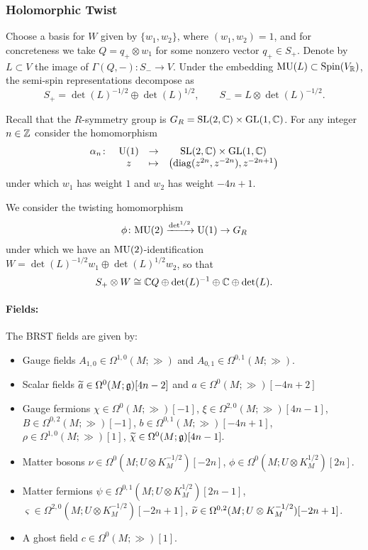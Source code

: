 \documentclass[10pt, oneside]{article}
\begin{document}
\subsubsection{Holomorphic Twist}
\label{sect:4d_2_holomorphictwist}

Choose a basis for $W$ given by $\{w_1, w_2\}$, where $(w_1, w_2) = 1$, and for concreteness we take $Q=q_+ \otimes w_1$ for some nonzero vector $q_+ \in S_+$. Denote by $L\subset V$ the image of $\Gamma(Q, -)\colon S_-\rightarrow V$. Under the embedding $\MU(L) \subset \Spin(V_\RR)$, the semi-spin representations decompose as
\[
S_+ = \det(L)^{-1/2} \oplus \det(L)^{1/2},\qquad S_- = L \otimes \det(L)^{-1/2} .
\]

Recall that the $R$-symmetry group is $G_R = \SL(2, \CC) \times \GL(1, \CC)$. For any integer $n\in\ZZ$ consider the homomorphism 
\[
\begin{array}{ccccc}
\alpha_n \colon & \U(1) & \rightarrow & \SL(2, \CC)\times \GL(1, \CC)\\
&  z & \mapsto & \left({\rm diag}(z^{2n}, z^{-2n}) , z^{-2n+1} \right)
\end{array}
\]
under which $w_1$ has weight $1$ and $w_2$ has weight $-4n+1$.

We consider the twisting homomorphism 
\[
\phi \colon \MU(2) \xto{\det^{1/2}} \U(1) \rightarrow G_R
\]
under which we have an $\MU(2)$-identification $W=\det(L)^{-1/2}w_1 \oplus \det(L)^{1/2}w_2$, so that
\[S_+\otimes W\cong \CC Q\oplus \det(L)^{-1}\oplus \CC\oplus \det(L).\]

\vspace{-10pt}
\paragraph{Fields:} The BRST fields are given by:
\begin{itemize}
\item Gauge fields $A_{1, 0}\in\Omega^{1, 0}(M; \gg)$ and $A_{0, 1}\in\Omega^{0, 1}(M; \gg)$.
\item Scalar fields $\Tilde{a} \in \Omega^{0}(M; \gg)[4n-2]$ and $a \in\Omega^{0}(M; \gg)[-4n+2]$
\item Gauge fermions $\chi \in \Omega^0(M ; \gg)[-1]$, $\xi \in \Omega^{2,0}(M ; \gg)[4n-1]$, $B \in \Omega^{0,2}(M ; \gg)[-1]$, $b \in \Omega^{0,1}(M ; \gg)[-4n+1]$, $\rho \in \Omega^{1,0}(M ; \gg)[1]$,  $\Tilde{\chi} \in \Omega^0(M ; \gg)[4n-1]$.
\item Matter bosons $\nu\in\Omega^0(M; U\otimes K_M^{-1/2})[-2n]$, $\phi\in\Omega^0(M; U\otimes K_M^{1/2})[2n]$.
\item Matter fermions $\psi \in \Omega^{0,1} (M ;  U\otimes K_M^{1/2})[2n-1]$, $\varsigma \in \Omega^{2,0} (M ; U\otimes K_M^{-1/2})[-2n+1]$, $\Tilde{\nu} \in \Omega^{0,2}(M ; U\otimes K_M^{-1/2})[-2n+1]$.
\item A ghost field $c\in \Omega^0(M; \gg)[1]$.
\end{itemize}
\end{document}
